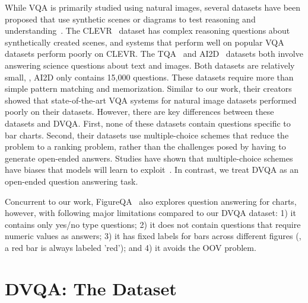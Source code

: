 \documentclass[10pt,twocolumn,letterpaper]{article}
\newcommand{\new}[1]{#1}
\begin{document}
While VQA is primarily studied using natural images, several datasets have been proposed that use synthetic scenes or diagrams to test reasoning and understanding~\cite{johnson2016clevr,kembhavi2016diagram,Kembhavi2017tqa}. The CLEVR~\cite{johnson2016clevr} dataset has complex reasoning questions about synthetically created scenes, and systems that perform well on popular VQA datasets perform poorly on CLEVR. The TQA~\cite{Kembhavi2017tqa} and AI2D~\cite{kembhavi2016diagram} datasets both involve answering science questions about text and images. Both datasets are relatively small, \eg, AI2D only contains 15,000 questions. These datasets require more than simple pattern matching and memorization. Similar to our work, their creators showed that state-of-the-art VQA systems for natural image datasets performed poorly on their datasets. However, there are key differences between these datasets and DVQA. First, none of these datasets contain questions specific to bar charts. Second, their datasets use multiple-choice schemes that reduce the problem to a ranking problem, rather than the challenges posed by having to generate open-ended answers. Studies have shown that multiple-choice schemes have biases that models will learn to exploit~\cite{jabri2016revisiting}. In contrast, we treat DVQA as an open-ended question answering task.

\new{Concurrent to our work, FigureQA~\cite{figureqa} also explores question answering for charts, however, with following major limitations compared to our DVQA dataset: 1) it contains only yes/no type questions; 2) it does not contain questions that require numeric values as answers; 3) it has fixed labels for bars across different figures (\eg, a red bar is always labeled 'red'); and 4) it avoids the OOV problem.}

\section{DVQA: The Dataset}
\end{document}
